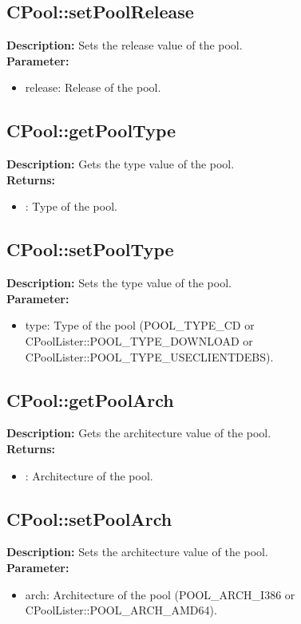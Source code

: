 \subsection{CPool::setPoolRelease}
\textbf{Description:} Sets the release value of the pool.\\
\textbf{Parameter:}
\begin{itemize}
\item release: Release of the pool.
\end{itemize}

\subsection{CPool::getPoolType}
\textbf{Description:} Gets the type value of the pool.\\
\textbf{Returns:}
\begin{itemize}
\item : Type of the pool.
\end{itemize}

\subsection{CPool::setPoolType}
\textbf{Description:} Sets the type value of the pool.\\
\textbf{Parameter:}
\begin{itemize}
\item type: Type of the pool (POOL\_TYPE\_CD or CPoolLister::POOL\_TYPE\_DOWNLOAD or CPoolLister::POOL\_TYPE\_USECLIENTDEBS).
\end{itemize}

\subsection{CPool::getPoolArch}
\textbf{Description:} Gets the architecture value of the pool.\\
\textbf{Returns:}
\begin{itemize}
\item : Architecture of the pool.
\end{itemize}

\subsection{CPool::setPoolArch}
\textbf{Description:} Sets the architecture value of the pool.\\
\textbf{Parameter:}
\begin{itemize}
\item arch: Architecture of the pool (POOL\_ARCH\_I386 or CPoolLister::POOL\_ARCH\_AMD64).
\end{itemize}


